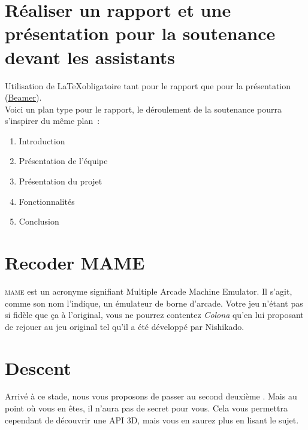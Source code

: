 \section{Réaliser un rapport et une présentation pour la soutenance devant les assistants}

Utilisation de \LaTeX obligatoire tant pour le rapport que pour la présentation (\href{http://lmgtfy.com/?q=beamer}{Beamer}).\\

Voici un plan type pour le rapport, le déroulement de la soutenance pourra s'inspirer du même plan~:

\begin{enumerate}
  \item Introduction
  \item Présentation de l'équipe
  \item Présentation du projet
  \item Fonctionnalités
  \item Conclusion
\end{enumerate}


\section{Recoder MAME}

\textsc{mame} est un acronyme signifiant \og Multiple Arcade Machine Emulator\fg. Il s'agit, comme son nom l'indique, un émulateur de borne d'arcade. Votre jeu n'étant pas si fidèle que ça à l'original, vous ne pourrez contentez \textit{Colona} qu'en lui proposant de rejouer au jeu original tel qu'il a été développé par Nishikado.


\section{Descent}

Arrivé à ce stade, nous vous proposons de passer au second deuxième \tp. Mais au point où vous en êtes, il n'aura pas de secret pour vous. Cela vous permettra cependant de découvrir une API 3D, mais vous en saurez plus en lisant le sujet.